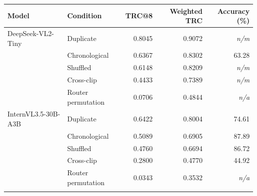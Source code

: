 \begin{tabular}{llrrr}
\toprule
Model & Condition & TRC@8 & Weighted TRC & Accuracy (\%) \\
\midrule
DeepSeek-VL2-Tiny & Duplicate & 0.8045 & 0.9072 & \textit{n/m} \\
 & Chronological & 0.6367 & 0.8302 & 63.28 \\
 & Shuffled & 0.6148 & 0.8209 & \textit{n/m} \\
 & Cross-clip & 0.4433 & 0.7389 & \textit{n/m} \\
 & Router permutation & 0.0706 & 0.4844 & \textit{n/a} \\
\addlinespace
InternVL3.5-30B-A3B & Duplicate & 0.6422 & 0.8004 & 74.61 \\
 & Chronological & 0.5089 & 0.6905 & 87.89 \\
 & Shuffled & 0.4760 & 0.6694 & 86.72 \\
 & Cross-clip & 0.2800 & 0.4770 & 44.92 \\
 & Router permutation & 0.0343 & 0.3532 & \textit{n/a} \\
\addlinespace
\bottomrule
\end{tabular}
